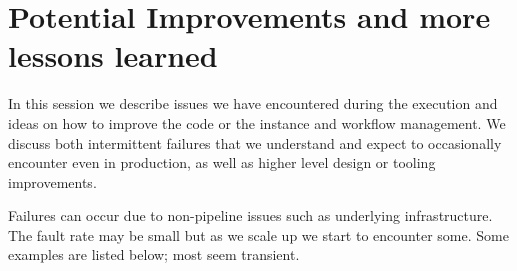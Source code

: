 \section{Potential Improvements and more lessons learned} \label{future}

In this session we describe issues we have encountered during the execution and ideas on how to improve the code or the instance and workflow management.
We discuss both intermittent failures that we understand and expect to occasionally encounter even in production, as well as higher level design or tooling improvements.

Failures can occur due to non-pipeline issues such as underlying infrastructure.
The fault rate may be small but as we scale up we start to encounter some.
Some examples are listed below; most seem transient.


